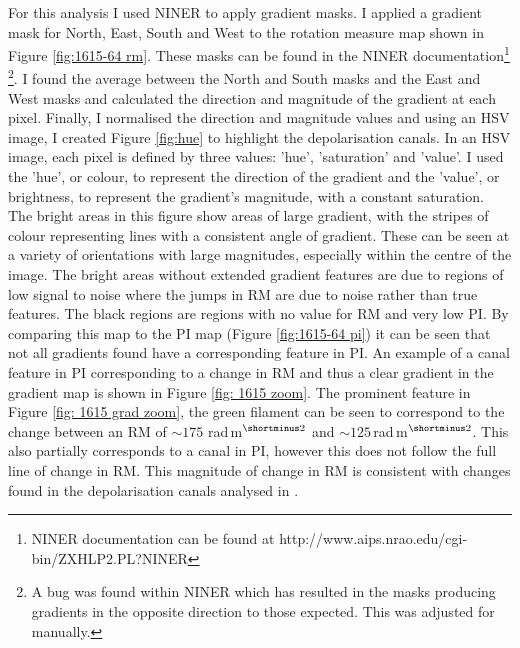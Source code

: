 For this analysis I used NINER to apply gradient masks. I applied a gradient mask for North, East, South and West to the rotation measure map shown in Figure \ref{fig:1615-64 rm}. These masks can be found in the NINER documentation\footnote{NINER documentation can be found at http://www.aips.nrao.edu/cgi-bin/ZXHLP2.PL?NINER} \footnote{A bug was found within NINER which has resulted in the masks producing gradients in the opposite direction to those expected. This was adjusted for manually.}. I found the average between the North and South masks and the East and West masks and calculated the direction and magnitude of the gradient at each pixel. Finally, I normalised the direction and magnitude values and using an HSV image, I created Figure \ref{fig:hue} to highlight the depolarisation canals. In an HSV image, each pixel is defined by three values: 'hue', 'saturation' and 'value'. I used the 'hue', or colour, to represent the direction of the gradient and the 'value', or brightness, to represent the gradient's magnitude, with a constant saturation. The bright areas in this figure show areas of large gradient, with the stripes of colour representing lines with a consistent angle of gradient. These can be seen at a variety of orientations with large magnitudes, especially within the centre of the image. The bright areas without extended gradient features are due to regions of low signal to noise where the jumps in RM are due to noise rather than true features. The black regions are regions with no value for RM and very low PI. By comparing this map to the PI map (Figure \ref{fig:1615-64 pi}) it can be seen that not all gradients found have a corresponding feature in PI. An example of a canal feature in PI corresponding to a change in RM and thus a clear gradient in the gradient map is shown in Figure \ref{fig: 1615 zoom}. The prominent feature in Figure \ref{fig: 1615 grad zoom}, the green filament can be seen to correspond to the change between an RM of $\sim 175$ rad$\,$m$^{\shortminus2}$ and $\sim 125\,$rad$\,$m$^{\shortminus2}$. This also partially corresponds to a canal in PI, however this does not follow the full line of change in RM. This magnitude of change in RM is consistent with changes found in the depolarisation canals analysed in \cite{turic_2021}.

